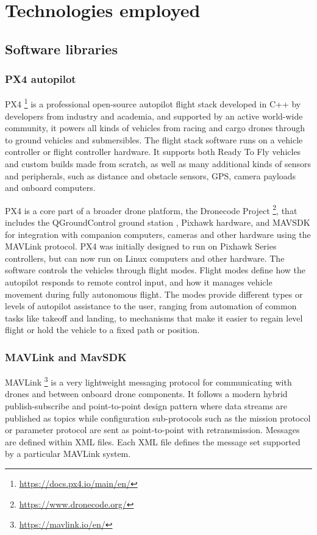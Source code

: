 \section{Technologies employed}

\subsection{Software libraries}

\subsubsection{PX4 autopilot}
\label{subsec:px4}
PX4 \footnote{\url{https://docs.px4.io/main/en/}} is a professional open-source autopilot flight stack developed in C++ by developers from industry and academia, and supported by an active world-wide community,
it powers all kinds of vehicles from racing and cargo drones through to ground vehicles and submersibles.
The flight stack software runs on a vehicle controller or flight controller hardware. It supports both Ready To Fly vehicles and custom builds made from scratch,
as well as many additional kinds of sensors and peripherals, such as distance and obstacle sensors, GPS, camera payloads and onboard computers.

PX4 is a core part of a broader drone platform, the Dronecode Project \footnote{\url{https://www.dronecode.org/}}, that includes the QGroundControl ground station , Pixhawk hardware,
and MAVSDK for integration with companion computers, cameras and other hardware using the MAVLink protocol.
PX4 was initially designed to run on Pixhawk Series controllers, but can now run on Linux computers and other hardware.
The software controls the vehicles through flight modes. 
Flight modes define how the autopilot responds to remote control input, and how it manages vehicle movement during fully autonomous flight.
The modes provide different types or levels of autopilot assistance to the user, ranging from automation of common tasks like takeoff and landing, 
to mechanisms that make it easier to regain level flight or hold the vehicle to a fixed path or position.

\subsubsection{MAVLink and MavSDK}
\label{subsec:mavlink}
MAVLink \footnote{\url{https://mavlink.io/en/}} is a very lightweight messaging protocol for communicating with drones and between onboard drone components. 
It follows a modern hybrid publish-subscribe and point-to-point design pattern 
where data streams are published as topics while configuration sub-protocols 
such as the mission protocol or parameter protocol are sent as point-to-point with retransmission. 
Messages are defined within XML files. 
Each XML file defines the message set supported by a particular MAVLink system.

